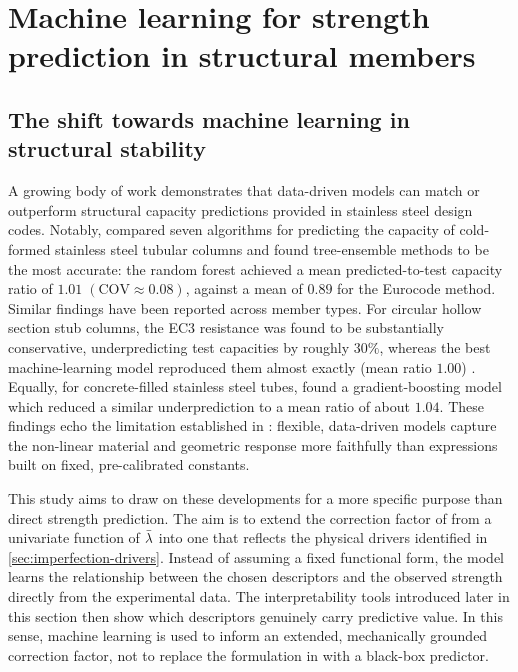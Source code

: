 
\section{Machine learning for strength prediction in structural members}

\subsection{The shift towards machine learning in structural stability}
\label{sec:ml-shift}

A growing body of work demonstrates that data-driven models can match or outperform structural capacity predictions provided in stainless steel design codes. Notably, \textcite{xu2021a} compared seven algorithms for predicting the capacity of cold-formed stainless steel tubular columns and found tree-ensemble methods to be the most accurate: the random forest achieved a mean predicted-to-test capacity ratio of $1.01\;(\mathrm{COV}\approx 0.08)$, against a mean of $0.89$ for the Eurocode method. Similar findings have been reported across member types. For circular hollow section stub columns, the EC3 resistance was found to be substantially conservative, underpredicting test capacities by roughly $30\%$, whereas the best machine-learning model reproduced them almost exactly (mean ratio $1.00$) \parencite{abarkan2024}. Equally, for concrete-filled stainless steel tubes, \textcite{tran2023} found a gradient-boosting model which reduced a similar underprediction to a mean ratio of about $1.04$. These findings echo the limitation established in : flexible, data-driven models capture the non-linear material and geometric response more faithfully than expressions built on fixed, pre-calibrated constants.

This study aims to draw on these developments for a more specific purpose than direct strength prediction. The aim is to extend the correction factor of  from a univariate function of $\bar{\lambda}$ into one that reflects the physical drivers identified in \cref{sec:imperfection-drivers}. Instead of assuming a fixed functional form, the model learns the relationship between the chosen descriptors and the observed strength directly from the experimental data. The interpretability tools introduced later in this section then show which descriptors genuinely carry predictive value. In this sense, machine learning is used to inform an extended, mechanically grounded correction factor, not to replace the formulation in  with a black-box predictor.

